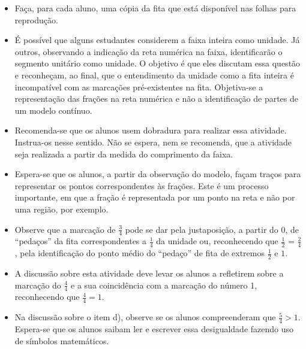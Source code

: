 \begin{multicols}{2}
\begin{orientacoes}{}{}
\begin{itemize} %
    \item       Faça, para cada aluno, uma cópia da fita que está disponível nas folhas para reprodução.
    \item       É possível que alguns estudantes considerem a faixa inteira como unidade. Já outros, observando a indicação da reta numérica na faixa, identificarão o segmento unitário como unidade. O objetivo é que eles discutam essa questão e reconheçam, ao final, que o entendimento da unidade como a fita inteira é incompatível com as marcações pré-existentes na fita. Objetiva-se a representação das frações na reta numérica e não a identificação de partes de um modelo contínuo.
    \item       Recomenda-se que os alunos usem dobradura para realizar essa atividade. Instrua-os nesse sentido. Não se espera, nem se recomenda, que a atividade seja realizada a partir da medida do comprimento da faixa.
    \item       Espera-se que os alunos, a partir da observação do modelo, façam traços para representar os pontos correspondentes às frações. Este é um processo importante, em que a fração é representada por um ponto na reta e não por uma região, por exemplo.
    \item       Observe que a marcação de       $\frac{3}{4}$       pode se dar pela justaposição, a partir do       $0$, de       ``pedaços''       da fita correspondentes a       $\frac{1}{4}$       da unidade ou, reconhecendo que       $\frac{1}{2}$       =       $\frac{2}{4}$, pela identificação do ponto médio do       ``pedaço''       de fita de extremos       $\frac{1}{2}$       e       $1$.
    \item A discussão sobre esta atividade deve levar os alunos a refletirem sobre a marcação do $\frac{4}{4}$ e a sua coincidência com a marcação do número 1, reconhecendo que $\frac{4}{4}=1$.
    \item Na discussão sobre o item d), observe se os alunos compreenderam que       $\frac{5}{4}>1$. Espera-se que os alunos saibam ler e escrever essa desigualdade fazendo uso de símbolos matemáticos.
\end{itemize} %
\end{orientacoes}

\begin{solucao}{}{}


\end{solucao}
\end{multicols}
